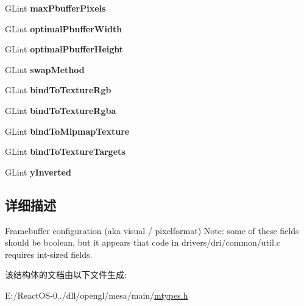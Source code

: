 \begin{DoxyCompactItemize}
\item 
\mbox{\label{structgl__config_a680134ef504c14bd87bf713f161bedc7}} 
G\+Lint {\bfseries max\+Pbuffer\+Pixels}
\item 
\mbox{\label{structgl__config_a5da4344f76cdcfc56a8d5d5e98c51824}} 
G\+Lint {\bfseries optimal\+Pbuffer\+Width}
\item 
\mbox{\label{structgl__config_a7c9bd9feb7885670c539eeb4440d02da}} 
G\+Lint {\bfseries optimal\+Pbuffer\+Height}
\item 
\mbox{\label{structgl__config_a16a9a49bad9c7dd2153a76984f2b3a3c}} 
G\+Lint {\bfseries swap\+Method}
\item 
\mbox{\label{structgl__config_a5951ada110c3934af2478b77d6ddc2ac}} 
G\+Lint {\bfseries bind\+To\+Texture\+Rgb}
\item 
\mbox{\label{structgl__config_aa47ab851459f238e8a951079a6a30658}} 
G\+Lint {\bfseries bind\+To\+Texture\+Rgba}
\item 
\mbox{\label{structgl__config_a5e0113a482b0fbc84641a6cbca75e8be}} 
G\+Lint {\bfseries bind\+To\+Mipmap\+Texture}
\item 
\mbox{\label{structgl__config_a01d2568ca3a3a4767328fa23e0f39d70}} 
G\+Lint {\bfseries bind\+To\+Texture\+Targets}
\item 
\mbox{\label{structgl__config_aab89af07569c19f4504a73909a32e45e}} 
G\+Lint {\bfseries y\+Inverted}
\end{DoxyCompactItemize}


\subsection{详细描述}
Framebuffer configuration (aka visual / pixelformat) Note\+: some of these fields should be boolean, but it appears that code in drivers/dri/common/util.\+c requires int-\/sized fields. 

该结构体的文档由以下文件生成\+:\begin{DoxyCompactItemize}
\item 
E\+:/\+React\+O\+S-\/0../dll/opengl/mesa/main/\hyperlink{mtypes_8h}{mtypes.\+h}\end{DoxyCompactItemize}
